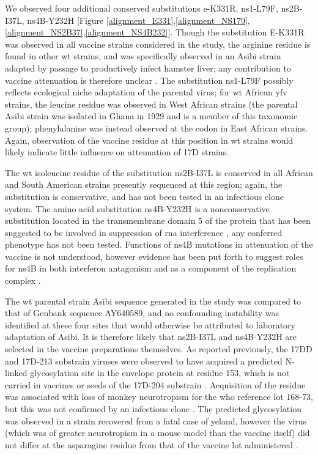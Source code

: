 We observed four additional conserved substitutions \gls{e}-K331R, \gls{ns}1-L79F, \gls{ns}2B-I37L, \gls{ns}4B-Y232H [Figure \ref{alignment_E331},\ref{alignment_NS179},\ref{alignment_NS2B37},\ref{alignment_NS4B232}]. Though the substitution E-K331R was observed in all vaccine strains considered in the study, the arginine residue is found in other \gls{wt} strains, and was specifically observed in an Asibi strain adapted by passage to productively infect hamster liver; any contribution to vaccine attenuation is therefore unclear \parencite{McArthur:2003fv}. The substitution \gls{ns}1-L79F possibly reflects ecological niche adaptation of the parental virus; for \gls{wt} African \gls{yfv} strains, the leucine residue was observed in West African strains (the parental Asibi strain was isolated in Ghana in 1929 and is a member of this taxonomic group); phenylalanine was instead observed at the codon in East African strains. Again, observation of the vaccine residue at this position in \gls{wt} strains would likely indicate little influence on attenuation of 17D strains. 

The \gls{wt} isoleucine residue of the substitution \gls{ns}2B-I37L is conserved in all African and South American strains presently sequenced at this region; again, the substitution is conservative, and has not been tested in an infectious clone system. The amino acid substitution \gls{ns}4B-Y232H is a nonconservative substitution located in the transmembrane domain 5 of the protein that has been suggested to be involved in suppression of \gls{rna} interference \parencite{Kakumani:2013gx}, any conferred phenotype has not been tested. Functions of \gls{ns}4B mutations in attenuation of the vaccine is not understood, however evidence has been put forth to suggest roles for \gls{ns}4B in both interferon antagonism and as a component of the replication complex \parencite{Zou:2014ku,MunozJordan:2005ia}. 

The \gls{wt} parental strain Asibi sequence generated in the study was compared to that of Genbank sequence AY640589, and no confounding instability was identified at these four sites that would otherwise be attributed to laboratory adaptation of Asibi. It is therefore likely that \gls{ns}2B-I37L and \gls{ns}4B-Y232H are selected in the vaccine preparations themselves. As reported previously, the 17DD and 17D-213 substrain viruses were observed to have acquired a predicted N-linked glycosylation site in the envelope protein at residue 153, which is not carried in vaccines or seeds of the 17D-204 substrain \parencite{dosSantos:1995wq}. Acquisition of the residue was associated with loss of monkey neurotropism for the \gls{who} reference lot 168-73, but this was not confirmed by an infectious clone \parencite{Moulin:2013cu}. The predicted glycosylation was observed in a strain recovered from a fatal case of \gls{yeland}, however the virus (which was of greater neurotropism in a mouse model than the vaccine itself) did not differ at the asparagine residue from that of the vaccine lot administered \parencite{Jennings:1994upa}.
